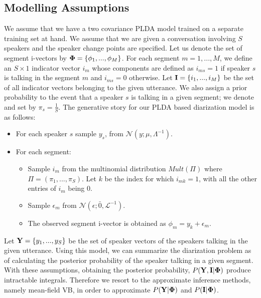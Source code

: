 \documentclass{article}
\begin{document}
\subsection{Modelling Assumptions}

We assume that we have a two covariance PLDA model trained on a separate training set at hand. We assume that we are given a conversation involving $S$ speakers and the speaker change points are specified. Let us denote the set of segment i-vectors by ${\bf\Phi}=\{\phi_1, ..., \phi_M\}$. For each segment $m = 1, ... , M$, we define an $S\times1$ indicator vector $i_m$ whose components are defined as $i_{ms}=1$ if speaker $s$ is talking in the segment $m$ and $i_{ms}=0$ otherwise. Let ${\bf I}=\{i_1,...,i_M\}$ be the set of all indicator vectors belonging to the given utterance. We also assign a prior probability to the event that a speaker $s$ is talking in a given segment; we denote and set by $\pi_s=\frac{1}{S}$. The generative story for our PLDA based diarization model is as follows:

\begin{itemize}
\item For each speaker $s$ sample $y_s$, from $\mathcal{N}(y;\mu,\Lambda^{-1})$.
\item For each segment:
    \begin{itemize}
    \item Sample $i_m$ from the multinomial distribution $Mult(\Pi)$ where $\Pi=(\pi_1,...,\pi_S)$. Let $k$ be the index for which $i_{mk}=1$, with all the other entries of $i_m$ being 0.
    \item Sample $\epsilon_m$ from $\mathcal{N}(\epsilon;\bar{0},\mathcal{L}^{-1})$.
    \item The observed segment i-vector is obtained as $\phi_{m}= y_k + \epsilon_m$.
    \end{itemize}
\end{itemize}
Let ${\bf Y}=\{y_1,...,y_S\}$ be the set of speaker vectors of the speakers talking in the given utterance. Using this model, we can summarize the diarization problem as of calculating the posterior probability of the speaker talking in a given segment. With these assumptions, obtaining the posterior probability, $P({\bf Y},{\bf I}|{\bf\Phi})$ produce intractable integrals. Therefore we resort to the  approximate inference methods, namely mean-field VB, in order to approximate $P({\bf Y}|{\bf\Phi})$ and $P({\bf I}|{\bf\Phi})$. 
\end{document}
